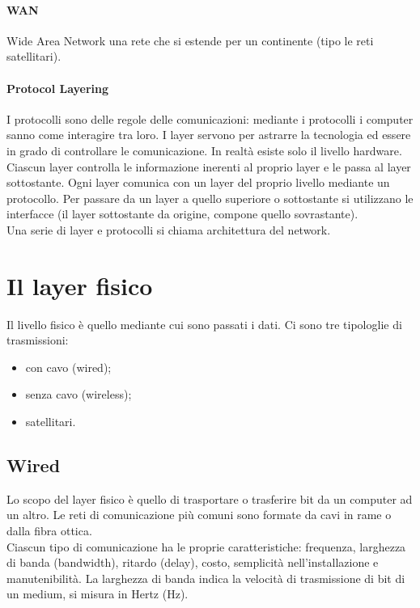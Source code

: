 \documentclass{article}
\begin{document}
\paragraph{WAN} Wide Area Network una rete che si estende per un continente (tipo
le reti satellitari).

\paragraph{Protocol Layering} I protocolli sono delle regole delle comunicazioni:
mediante i protocolli i computer sanno come interagire tra loro.
I layer servono per astrarre la tecnologia ed essere in grado di controllare le
comunicazione. In realtà esiste solo il livello hardware.
Ciascun layer controlla le informazione inerenti al proprio layer e le
passa al layer sottostante. Ogni layer comunica con un layer del proprio
livello mediante un protocollo. Per passare da un layer a quello superiore o
sottostante si utilizzano le interfacce (il layer sottostante da origine,
compone quello sovrastante).\\
Una serie di layer e protocolli si chiama architettura del network.

\section{Il layer fisico}
Il livello fisico è quello mediante cui sono passati i dati. Ci sono tre
tipologlie di trasmissioni:
\begin{itemize}
	\item con cavo (wired);
	\item senza cavo (wireless);
	\item satellitari.
\end{itemize}

\subsection{Wired}
Lo scopo del layer fisico è quello di trasportare o trasferire bit da un
computer ad un altro. Le reti di comunicazione più comuni sono formate da cavi
in rame o dalla fibra ottica.\\
Ciascun tipo di comunicazione ha le proprie caratteristiche: frequenza,
larghezza di banda (bandwidth), ritardo (delay), costo, semplicità
nell'installazione e manutenibilità. La larghezza di banda indica la velocità
di trasmissione di bit di un medium, si misura in Hertz (Hz).
\end{document}
